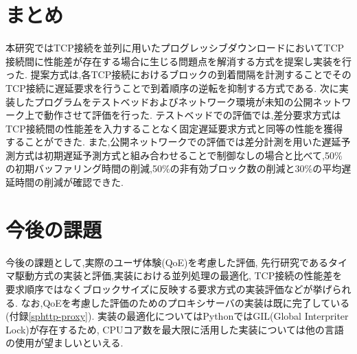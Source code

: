 \documentclass[a4j,12pt]{gradthesis_utf8}
\begin{document}
\section{まとめ}
本研究ではTCP接続を並列に用いたプログレッシブダウンロードにおいてTCP接続間に性能差が存在する場合に生じる問題点を解消する方式を提案し実装を行った.
提案方式は,各TCP接続におけるブロックの到着間隔を計測することでそのTCP接続に遅延要求を行うことで到着順序の逆転を抑制する方式である.
次に実装したプログラムをテストベッドおよびネットワーク環境が未知の公開ネットワーク上で動作させて評価を行った.
テストベッドでの評価では,差分要求方式はTCP接続間の性能差を入力することなく固定遅延要求方式と同等の性能を獲得することができた.
また,公開ネットワークでの評価では差分計測を用いた遅延予測方式は初期遅延予測方式と組み合わせることで制御なしの場合と比べて,50\%の初期バッファリング時間の削減,50\%の非有効ブロック数の削減と30\%の平均遅延時間の削減が確認できた.


\section{今後の課題}
今後の課題として,実際のユーザ体験(QoE)を考慮した評価\cite{future},
先行研究であるタイマ駆動方式の実装と評価,実装における並列処理の最適化,
TCP接続の性能差を要求順序ではなくブロックサイズに反映する要求方式の実装評価などが挙げられる.
なお,QoEを考慮した評価のためのプロキシサーバの実装は既に完了している(付録\ref{sphttp-proxy}).
実装の最適化についてはPythonではGIL(Global Interpriter Lock)が存在するため,
CPUコア数を最大限に活用した実装については他の言語の使用が望ましいといえる.
\end{document}
